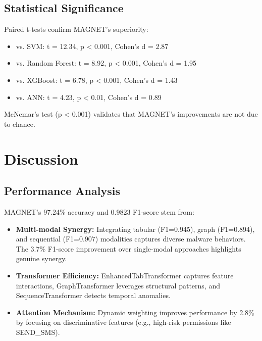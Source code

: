 \documentclass[10pt,conference]{IEEEtran}
\begin{document}
\subsection{Statistical Significance}
Paired t-tests confirm MAGNET’s superiority:
\begin{itemize}
    \item vs. SVM: t = 12.34, p < 0.001, Cohen’s d = 2.87
    \item vs. Random Forest: t = 8.92, p < 0.001, Cohen’s d = 1.95
    \item vs. XGBoost: t = 6.78, p < 0.001, Cohen’s d = 1.43
    \item vs. ANN: t = 4.23, p < 0.01, Cohen’s d = 0.89
\end{itemize}
McNemar’s test (p < 0.001) validates that MAGNET’s improvements are not due to chance.

\section{Discussion}\label{sec:discussion}
\subsection{Performance Analysis}
MAGNET’s 97.24\% accuracy and 0.9823 F1-score stem from:
\begin{itemize}
    \item \textbf{Multi-modal Synergy:} Integrating tabular (F1=0.945), graph (F1=0.894), and sequential (F1=0.907) modalities captures diverse malware behaviors. The 3.7\% F1-score improvement over single-modal approaches highlights genuine synergy.
    \item \textbf{Transformer Efficiency:} EnhancedTabTransformer captures feature interactions, GraphTransformer leverages structural patterns, and SequenceTransformer detects temporal anomalies.
    \item \textbf{Attention Mechanism:} Dynamic weighting improves performance by 2.8\% by focusing on discriminative features (e.g., high-risk permissions like SEND\_SMS).
\end{itemize}
\end{document}
